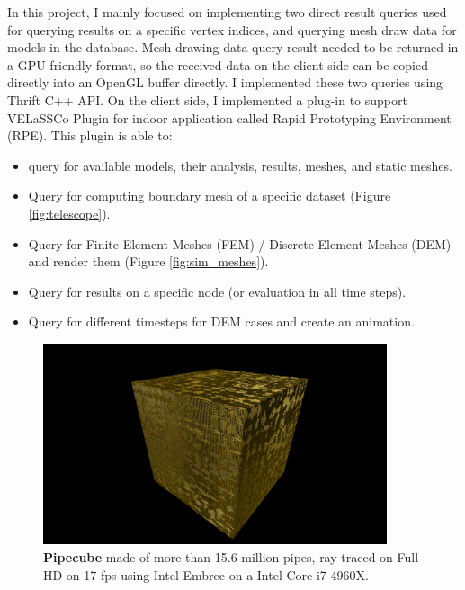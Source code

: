 \documentclass[]{report}
\begin{document}
In this project, I mainly focused on implementing two direct result queries used for querying results on a specific vertex indices, and querying mesh draw data for models in the database. Mesh drawing data query result needed to be returned in a GPU friendly format, so the received data on the client side can be copied directly into an OpenGL buffer directly. I implemented these two queries using Thrift C++ API. On the client side, I implemented a plug-in to support VELaSSCo Plugin for indoor application called Rapid Prototyping Environment (RPE). This plugin is able to:
  
\begin{itemize}
	\item query for available models, their analysis, results, meshes, and static meshes.
	\item Query for computing boundary mesh of a specific dataset (Figure \ref{fig:telescope}).
	\item Query for Finite Element Meshes (FEM) / Discrete Element Meshes (DEM) and render them (Figure \ref{fig:sim_meshes}).
	\item Query for results on a specific node (or evaluation in all time steps).
	\item Query for different timesteps for DEM cases and create an animation.
\end{itemize}

\begin{figure}[!ht]
	\centering
	\includegraphics[width=0.90\textwidth]{./figs/pipecube.png}
	\caption[Pipecube]{\textbf{Pipecube} made of more than 15.6 million pipes, ray-traced on Full HD on 17 fps using Intel Embree on a Intel Core i7-4960X.}
	\label{fig:pipecube}
\end{figure}
\end{document}
